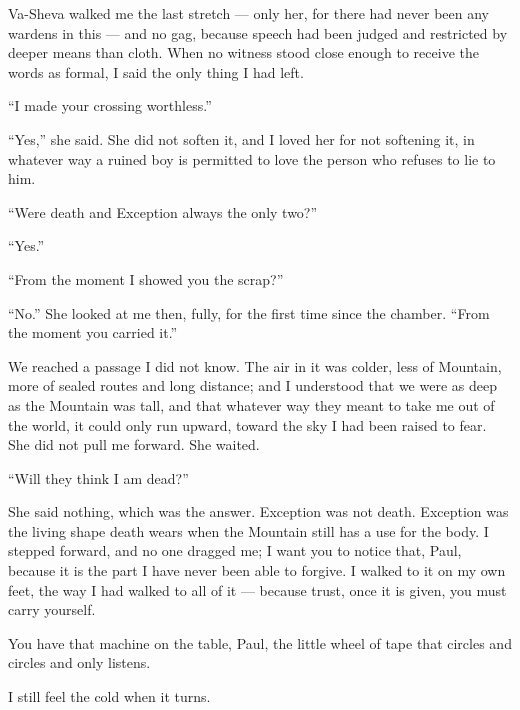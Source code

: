 Va-Sheva walked me the last stretch — only her, for there had never been any wardens in this — and no gag, because speech had been judged and restricted by deeper means than cloth. When no witness stood close enough to receive the words as formal, I said the only thing I had left.\par

``I made your crossing worthless.''\par

``Yes,'' she said. She did not soften it, and I loved her for not softening it, in whatever way a ruined boy is permitted to love the person who refuses to lie to him.\par

``Were death and Exception always the only two?''\par

``Yes.''\par

``From the moment I showed you the scrap?''\par

``No.'' She looked at me then, fully, for the first time since the chamber. ``From the moment you carried it.''\par

We reached a passage I did not know. The air in it was colder, less of Mountain, more of sealed routes and long distance; and I understood that we were as deep as the Mountain was tall, and that whatever way they meant to take me out of the world, it could only run upward, toward the sky I had been raised to fear. She did not pull me forward. She waited.\par

``Will they think I am dead?''\par

She said nothing, which was the answer. Exception was not death. Exception was the living shape death wears when the Mountain still has a use for the body. I stepped forward, and no one dragged me; I want you to notice that, Paul, because it is the part I have never been able to forgive. I walked to it on my own feet, the way I had walked to all of it — because trust, once it is given, you must carry yourself.\par

\ornament

You have that machine on the table, Paul, the little wheel of tape that circles and circles and only listens.\par

I still feel the cold when it turns.\par

